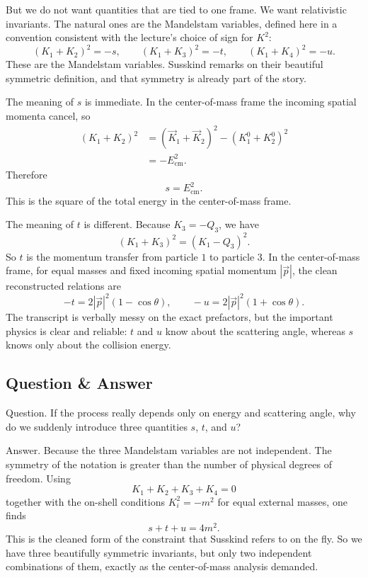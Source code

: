 But we do not want quantities that are tied to one frame. We want relativistic invariants. The natural ones are the Mandelstam variables, defined here in a convention consistent with the lecture's choice of sign for \(K^2\):
\begin{equation}
(K_1+K_2)^2=-s,\qquad (K_1+K_3)^2=-t,\qquad (K_1+K_4)^2=-u.
\end{equation}
These are the Mandelstam variables. Susskind remarks on their beautiful symmetric definition, and that symmetry is already part of the story.

The meaning of \(s\) is immediate. In the center-of-mass frame the incoming spatial momenta cancel, so
\begin{align}
(K_1+K_2)^2
&=(\vec K_1+\vec K_2)^2-(K_1^0+K_2^0)^2 \\
&= -E_{\mathrm{cm}}^2.
\end{align}
Therefore
\begin{equation}
s=E_{\mathrm{cm}}^2.
\end{equation}
This is the square of the total energy in the center-of-mass frame.

The meaning of \(t\) is different. Because \(K_3=-Q_3\), we have
\begin{equation}
(K_1+K_3)^2=(K_1-Q_3)^2.
\end{equation}
So \(t\) is the momentum transfer from particle \(1\) to particle \(3\). In the center-of-mass frame, for equal masses and fixed incoming spatial momentum \(|\vec p|\), the clean reconstructed relations are
\begin{equation}
-t = 2|\vec p|^2(1-\cos\theta),\qquad -u = 2|\vec p|^2(1+\cos\theta).
\end{equation}
The transcript is verbally messy on the exact prefactors, but the important physics is clear and reliable: \(t\) and \(u\) know about the scattering angle, whereas \(s\) knows only about the collision energy.

\subsection{Question \& Answer}

Question. If the process really depends only on energy and scattering angle, why do we suddenly introduce three quantities \(s\), \(t\), and \(u\)?

Answer. Because the three Mandelstam variables are not independent. The symmetry of the notation is greater than the number of physical degrees of freedom. Using
\begin{equation}
K_1+K_2+K_3+K_4=0
\end{equation}
together with the on-shell conditions \(K_i^2=-m^2\) for equal external masses, one finds
\begin{equation}
s+t+u=4m^2.
\end{equation}
This is the cleaned form of the constraint that Susskind refers to on the fly. So we have three beautifully symmetric invariants, but only two independent combinations of them, exactly as the center-of-mass analysis demanded.

